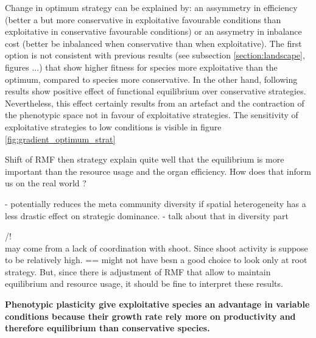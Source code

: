 Change in optimum strategy can be explained by: an assymmetry in efficiency (better a but more conservative in exploitative favourable conditions than exploitative in conservative favourable conditions) or an assymetry in inbalance cost (better be inbalanced when conservative than when exploitative). The first option is not consistent with previous results (see subsection \ref{section:landscape}, figures ...) that show higher fitness for species more exploitative than the optimum, compared to species more conservative. In the other hand, following results show positive effect of functional equilibrium over conservative strategies. Nevertheless, this effect certainly results from an artefact and the contraction of the phenotypic space not in favour of exploitative strategies. The sensitivity of exploitative strategies to low conditions is visible in figure \ref{fig:gradient_optimum_strat}

Shift of RMF then strategy explain quite well that the equilibrium is more important than the resource usage and the organ efficiency. How does that inform us on the real world ?

 - potentially reduces the meta community diversity if spatial heterogeneity has a less drastic effect on strategic dominance. - talk about that in diversity part

/!\\ may come from a lack of coordination with shoot. Since shoot activity is suppose to be relatively high. == might not have besn a good choice to look only at root strategy. But, since there is adjustment of RMF that allow to maintain equilibrium and resource usage, it should be fine to interpret these results.

\textbf{Phenotypic plasticity give exploitative species an advantage in variable conditions because their growth rate rely more on productivity and therefore equilibrium than conservative species. }

%




